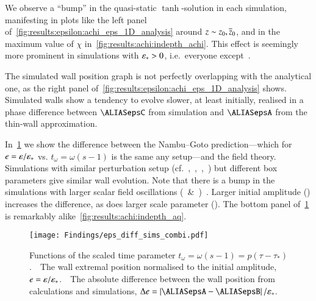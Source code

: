 We observe a ``bump'' in the quasi-static $\tanh$-solution in each simulation, manifesting in plots like the left panel of~\cref{fig:results:epsilon:achi_eps_1D_analysis} around $z\sim z_0,\overline{z}_0$, and in the maximum value of $\chi$ in~\cref{fig:results:achi:indepth_achi}. This effect is seemingly more prominent in simulations with $\varepsilon_\ast >0$, i.e.~everyone except~. 

The simulated wall position graph is not perfectly overlapping with the analytical one, as the right panel of~\cref{fig:results:epsilon:achi_eps_1D_analysis} shows. Simulated walls show a tendency to evolve slower, at least initially, realised in a phase difference between $\epsC$ from simulation and $\epsA$ from the thin-wall approximation.%


In~\cref{fig:results:epsilon:eps_diff_sims_combi} we show the difference between the Nambu--Goto prediction---which for $e=\varepsilon/\varepsilon_\ast$ vs. $t_\omega=\omega (s-1)$ is the same any setup---and the field theory. Simulations with similar perturbation setup (cf.~,~,~,~) but different box parameters give similar wall evolution. Note that there is a bump in the simulations with larger scalar field oscillations (~\&~)~. %
Larger initial amplitude () increases the difference, as does larger scale parameter (). %
The bottom panel of~\cref{fig:results:epsilon:eps_diff_sims_combi} is remarkably alike~\cref{fig:results:achi:indepth_aq}.
\begin{figure}[h]
    \centering
    \texttt{[image: Findings/eps\_diff\_sims\_combi.pdf]}
    \caption{Functions of the scaled time parameter $t_\omega = \omega (s-1) = p(\tau-\tau_\ast)$.~~The wall extremal position normalised to the initial amplitude, $e=\varepsilon/\varepsilon_\ast$.~~The absolute difference between the wall position from calculations and simulations, $\Delta e = \abs*{\epsA-\epsB}/\epsast$.}
    \label{fig:results:epsilon:eps_diff_sims_combi}
\end{figure}


